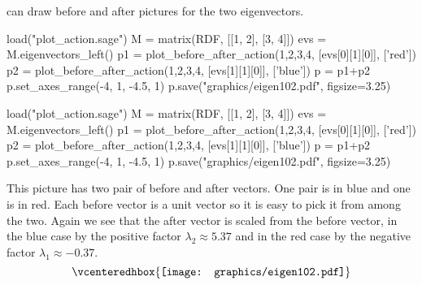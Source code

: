 \Sage{} can draw before and after pictures for the two eigenvectors.
\begin{sageoutput}[d,0,3]
load("plot_action.sage")  
M = matrix(RDF, [[1, 2], [3, 4]])
evs = M.eigenvectors_left()  
p1 = plot_before_after_action(1,2,3,4, [evs[0][1][0]], ['red']) 
p2 = plot_before_after_action(1,2,3,4, [evs[1][1][0]], ['blue']) 
p = p1+p2
p.set_axes_range(-4, 1, -4.5, 1) 
p.save("graphics/eigen102.pdf", figsize=3.25)
\end{sageoutput}
\begin{sagesilent}
load("plot_action.sage")  
M = matrix(RDF, [[1, 2], [3, 4]])
evs = M.eigenvectors_left()  
p1 = plot_before_after_action(1,2,3,4, [evs[0][1][0]], ['red']) 
p2 = plot_before_after_action(1,2,3,4, [evs[1][1][0]], ['blue']) 
p = p1+p2
p.set_axes_range(-4, 1, -4.5, 1) 
p.save("graphics/eigen102.pdf", figsize=3.25)
\end{sagesilent}
\noindent
This picture has two pair of before and after vectors.
One pair is in blue and one is in red.
Each before vector is a unit vector so it is easy to pick it from among the
two.
Again we see that 
the after vector is scaled from the before vector, 
in the blue case by the positive factor $\lambda_2\approx 5.37$ and
in the red case by the negative factor $\lambda_1\approx -0.37$.
\begin{equation*}
  \vcenteredhbox{\texttt{[image: graphics/eigen102.pdf]}}
\end{equation*}




